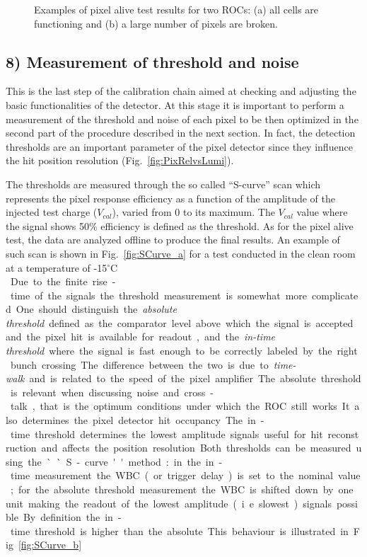 \begin{figure}[!htb]
 \begin{center}
 \end{center}
 \caption{Examples of pixel alive test results for two ROCs: (a) all cells are functioning and (b) a large number of pixels are broken.}
 \label{fig:PixelAlive}
\end{figure}

\subsection*{8) Measurement of threshold and noise}

This is the last step of the calibration chain aimed at checking and adjusting the basic functionalities of the detector.
At this stage it is important to perform a measurement of the threshold and noise of each pixel to be then optimized in the second part of the procedure described in the next section.
In fact, the detection thresholds are an important parameter of the pixel detector since they influence the hit position resolution (Fig.~\ref{fig:PixRelvsLumi}).

The thresholds are measured through the so called ``S-curve'' scan which represents the pixel response efficiency as a function of the amplitude of the injected test charge ($V_{cal}$), varied from 0 to its maximum.
The $V_{cal}$ value where the signal shows 50\% efficiency is defined as the threshold.
As for the pixel alive test, the data are analyzed offline to produce the final results.
An example of such scan is shown in Fig.~\ref{fig:SCurve_a} for a test conducted in the clean room at a temperature of -15\unit{$^\circ$C}.\\

Due to the finite rise-time of the signals the threshold measurement is somewhat more complicated. 
One should distinguish the {\it absolute threshold} defined as the comparator level above which the signal is accepted and the pixel hit is available for readout, and the {\it in-time threshold} where the signal is fast enough to be correctly labeled by the right bunch crossing.
The difference between the two is due to {\it time-walk} and is related to the speed of the pixel amplifier.
The absolute threshold is relevant when discussing noise and cross-talk, that is the optimum conditions under which the ROC still works. It also determines the pixel detector hit occupancy.
The in-time threshold determines the lowest amplitude signals useful for hit reconstruction and affects the position resolution.
Both thresholds can be measured using the ``S-curve'' method: in the in-time measurement the WBC (or trigger delay) is set to the nominal value; for the absolute threshold measurement the WBC is shifted down by one unit making the readout of the lowest amplitude (i.e. slowest) signals possible. By definition the in-time threshold is higher than the absolute. This behaviour is illustrated in Fig.~\ref{fig:SCurve_b}.\\


